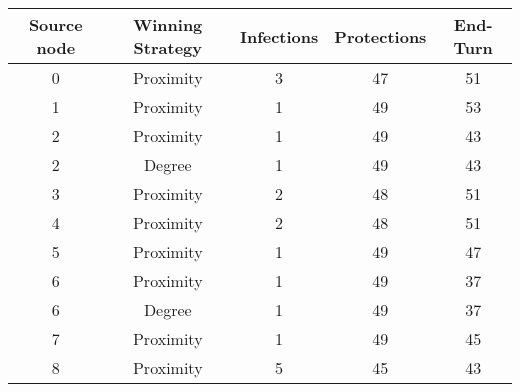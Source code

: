 \documentclass[results.tex]{subfiles}
\begin{document}
    \begin{center}
        \begin{tabular}{| c || c | c | c | c |}
            \hline
            {\bfseries Source node} & {\bfseries Winning Strategy} & {\bfseries Infections} & {\bfseries Protections}
            & {\bfseries End-Turn}
            \\  %
            \hline\hline
            0                       & Proximity                    & 3                      & 47                      & 51                   \\
            \hline
            1                       & Proximity                    & 1                      & 49                      & 53                   \\
            \hline
            2                       & Proximity                    & 1                      & 49                      & 43                   \\
            \hline
            2                       & Degree                       & 1                      & 49                      & 43                   \\
            \hline
            3                       & Proximity                    & 2                      & 48                      & 51                   \\
            \hline
            4                       & Proximity                    & 2                      & 48                      & 51                   \\
            \hline
            5                       & Proximity                    & 1                      & 49                      & 47                   \\
            \hline
            6                       & Proximity                    & 1                      & 49                      & 37                   \\
            \hline
            6                       & Degree                       & 1                      & 49                      & 37                   \\
            \hline
            7                       & Proximity                    & 1                      & 49                      & 45                   \\
            \hline
            8                       & Proximity                    & 5                      & 45                      & 43                   \\

\end{tabular}
\end{center}
\end{document}
